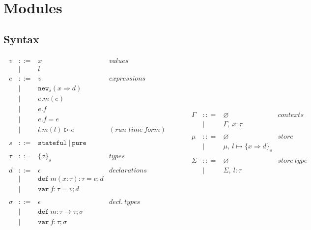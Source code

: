 \documentclass{llncs}
\newcommand{\keywadj}[1]{\mathtt{#1}}
\newcommand{\keyw}[1]{\keywadj{#1}~}
\begin{document}
\section{Modules}

\subsection{Syntax}

\[
\begin{array}{lll}
\begin{array}{lllr}
v & ::= & x & values \\
   & | & l \\
e & ::= & v & expressions \\
& | & \keywadj{new}_{s}(x \Rightarrow d) \\
& | & e.m(e)\\
& | & e.f \\
& | & e.f = e \\
& | & l.m(l) \rhd e & (run\mbox{-}time~form)\\
&&\\
s & ::= & \keyw{stateful} | ~\keyw{pure} \\
&&\\
\tau & ::= & \{ \sigma \}_{s} & types \\
&&\\
d & ::= & \epsilon & declarations \\
  & |   & \keyw{def} m(x:\tau):\tau = e; d \\
  & |   & \keyw{var} f:\tau = v; d \\
&&\\
\sigma & ::= & \epsilon & decl.~ types \\
       & |   & \keyw{def} m:\tau \rightarrow \tau; \sigma \\
       & |   & \keyw{var} f:\tau; \sigma \\
&&\\
\end{array}
& ~~~~~~
&
\begin{array}{lllr}
\Gamma & :: = & \varnothing & contexts\\
& | & \Gamma,~x : \tau\\
&&\\
\mu & :: = & \varnothing & store\\
& | & \mu,~l \mapsto \{ x \Rightarrow d \}_{s}\\
&&\\
\Sigma & :: = & \varnothing & store~type\\
& | & \Sigma,~l : \tau\\

\end{array}
\end{array}\]
\end{document}
